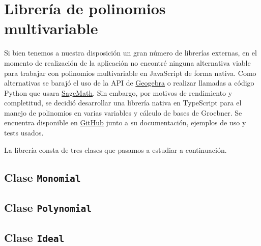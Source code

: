 \section{Librería de polinomios multivariable}
Si bien tenemos a nuestra disposición un gran número de librerías externas, en el momento de realización de la aplicación no encontré ninguna alternativa viable para trabajar con polinomios multivariable en JavaScript de forma nativa. Como alternativas se barajó el uso de la API de \href{https://wiki.geogebra.org/en/Reference:GeoGebra_Apps_API}{Geogebra} o realizar llamadas a código Python que usara \href{https://www.sagemath.org/}{SageMath}. Sin embargo, por motivos de rendimiento y completitud, se decidió desarrollar una librería nativa en TypeScript para el manejo de polinomios en varias variables y cálculo de bases de Groebner. Se encuentra disponible en \href{https://github.com/Daniel2000815/multivariate-polynomial}{GitHub} junto a su documentación, ejemplos de uso y tests usados.\newline

La librería consta de tres clases que pasamos a estudiar a continuación.

\subsection{Clase \texttt{Monomial}}

\subsection{Clase \texttt{Polynomial}}

\subsection{Clase \texttt{Ideal}}